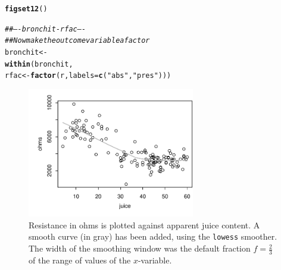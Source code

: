 \documentclass[12pt, a4paper,  BCOR=8.25mm, DIV=15]{scrartcl}\usepackage[]{graphicx}\usepackage[]{color}
\makeatletter
\newcommand{\hlstr}[1]{\textcolor[rgb]{0.192,0.494,0.8}{#1}}%
\newcommand{\hlcom}[1]{\textcolor[rgb]{0.678,0.584,0.686}{\textit{#1}}}%
\newcommand{\hlstd}[1]{\textcolor[rgb]{0.345,0.345,0.345}{#1}}%
\newcommand{\hlkwb}[1]{\textcolor[rgb]{0.69,0.353,0.396}{#1}}%
\newcommand{\hlkwc}[1]{\textcolor[rgb]{0.333,0.667,0.333}{#1}}%
\newcommand{\hlkwd}[1]{\textcolor[rgb]{0.737,0.353,0.396}{\textbf{#1}}}%
\newenvironment{kframe}{%
 \def\at@end@of@kframe{}%
 \ifinner\ifhmode%
  \def\at@end@of@kframe{\end{minipage}}%
  \begin{minipage}{\columnwidth}%
 \fi\fi%
 \def\FrameCommand##1{\hskip\@totalleftmargin \hskip-\fboxsep
 \colorbox{shadecolor}{##1}\hskip-\fboxsep
     \hskip-\linewidth \hskip-\@totalleftmargin \hskip\columnwidth}%
 \MakeFramed {\advance\hsize-\width
   \@totalleftmargin\z@ \linewidth\hsize
   \@setminipage}}%
 {\par\unskip\endMakeFramed%
 \at@end@of@kframe}
\newenvironment{knitrout}{}{} %
\newcommand{\txtt}[1]{{\texttt{#1}}}
\makeatother
\begin{document}
\begin{knitrout}
\color{fgcolor}\begin{kframe}
\begin{alltt}
\hlkwd{figset12}\hlstd{()}
\end{alltt}


{\ttfamily\noindent\itshape\color{messagecolor}{\\Attaching package: 'DAAG'}}

{\ttfamily\noindent\itshape\color{messagecolor}{The following object is masked from 'package:MASS':

\ \ \ \ hills}}\begin{alltt}
  \hlcom{## ---- bronchit-rfac ----}
\hlcom{## Now make the outcome variable a factor}
\hlstd{bronchit} \hlkwb{<-}
  \hlkwd{within}\hlstd{(bronchit,}
         \hlstd{rfac} \hlkwb{<-} \hlkwd{factor}\hlstd{(r,} \hlkwc{labels}\hlstd{=}\hlkwd{c}\hlstd{(}\hlstr{"abs"}\hlstd{,}\hlstr{"pres"}\hlstd{)))}
\end{alltt}
\end{kframe}
\end{knitrout}


\begin{figure}
\begin{knitrout}
\color{fgcolor}

{\centering \includegraphics[width=0.65\textwidth]{figs/xmeth-smooth-ohms-12_1-1} 

}



\end{knitrout}
  \caption{Resistance in ohms is plotted against apparent juice
    content.  A smooth curve (in gray) has been added, using the
    \txtt{lowess} smoother.  The width of the smoothing window was the
    default fraction $f = \frac{2}{3}$ of the range of values of the
    $x$-variable.}\label{fig:fruitohms}
\end{figure}
\end{document}
